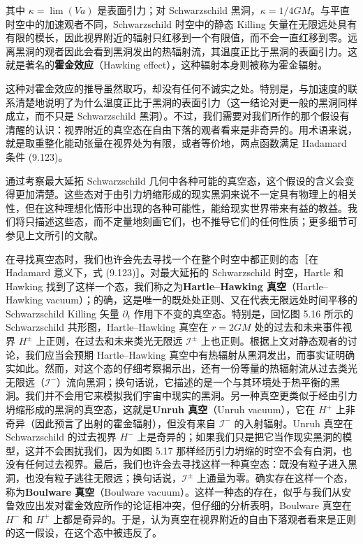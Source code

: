 其中 $\kappa = \lim(Va)$ 是表面引力；对 Schwarzschild 黑洞，$\kappa = 1/4GM$。与平直时空中的加速观者不同，Schwarzschild 时空中的静态 Killing 矢量在无限远处具有有限的模长，因此视界附近的辐射只红移到一个有限值，而不会一直红移到零。远离黑洞的观者因此会看到黑洞发出的热辐射流，其温度正比于黑洞的表面引力。这就是著名的\textbf{霍金效应}（Hawking effect），这种辐射本身则被称为霍金辐射。

这种对霍金效应的推导虽然取巧，却没有任何不诚实之处。特别是，与加速度的联系清楚地说明了为什么温度正比于黑洞的表面引力（这一结论对更一般的黑洞同样成立，而不只是 Schwarzschild 黑洞）。不过，我们需要对我们所作的那个假设有清醒的认识：视界附近的真空态在自由下落的观者看来是非奇异的。用术语来说，就是取重整化能动张量在视界处为有限，或者等价地，两点函数满足 Hadamard 条件 (9.123)。

通过考察最大延拓 Schwarzschild 几何中各种可能的真空态，这个假设的含义会变得更加清楚。这些态对于由引力坍缩形成的现实黑洞来说不一定具有物理上的相关性，但在这种理想化情形中出现的各种可能性，能给现实世界带来有益的教益。我们将只描述这些态，而不定量地刻画它们，也不推导它们的任何性质；更多细节可参见上文所引的文献。

在寻找真空态时，我们也许会先去寻找一个在整个时空中都正则的态［在 Hadamard 意义下，式 (9.123)］。对最大延拓的 Schwarzschild 时空，Hartle 和 Hawking 找到了这样一个态，我们称之为\textbf{Hartle--Hawking 真空}（Hartle--Hawking vacuum）；的确，这是唯一的既处处正则、又在代表无限远处时间平移的 Schwarzschild Killing 矢量 $\partial_{t}$ 作用下不变的真空态。特别是，回忆图 5.16 所示的 Schwarzschild 共形图，Hartle--Hawking 真空在 $r = 2GM$ 处的过去和未来事件视界 $H^{\pm}$ 上正则，在过去和未来类光无限远 $\mathscr{I}^{\pm}$ 上也正则。根据上文对静态观者的讨论，我们应当会预期 Hartle--Hawking 真空中有热辐射从黑洞发出，而事实证明确实如此。然而，对这个态的仔细考察揭示出，还有一份等量的热辐射流从过去类光无限远（$\mathscr{I}^{-}$）流向黑洞；换句话说，它描述的是一个与其环境处于热平衡的黑洞。我们并不会用它来模拟我们宇宙中现实的黑洞。另一种真空更类似于经由引力坍缩形成的黑洞的真空态，这就是\textbf{Unruh 真空}（Unruh vacuum），它在 $H^{+}$ 上非奇异（因此预言了出射的霍金辐射），但没有来自 $\mathscr{I}^{-}$ 的入射辐射。Unruh 真空在 Schwarzschild 的过去视界 $H^{-}$ 上是奇异的；如果我们只是把它当作现实黑洞的模型，这并不会困扰我们，因为如图 5.17 那样经历引力坍缩的时空不会有白洞，也没有任何过去视界。最后，我们也许会去寻找这样一种真空态：既没有粒子进入黑洞，也没有粒子逃往无限远；换句话说，$\mathscr{I}^{\pm}$ 上通量为零。确实存在这样一个态，称为\textbf{Boulware 真空}（Boulware vacuum）。这样一种态的存在，似乎与我们从安鲁效应出发对霍金效应所作的论证相冲突，但仔细的分析表明，Boulware 真空在 $H^{-}$ 和 $H^{+}$ 上都是奇异的。于是，认为真空在视界附近的自由下落观者看来是正则的这一假设，在这个态中被违反了。

